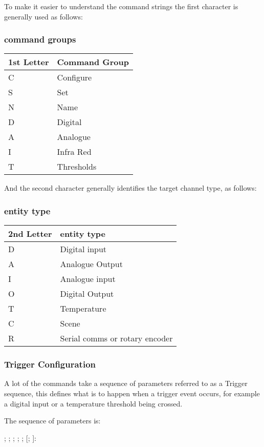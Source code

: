 To make it easier to understand the command strings the first character is generally used as follows:

\subsubsection{command groups}
\begin{tabular}{l|p{12cm}}
1st Letter&Command Group\\
\hline
C&Configure\\
S&Set\\
N&Name\\
D&Digital\\
A&Analogue\\
I&Infra Red\\
T&Thresholds\\
\end{tabular}

And the second character generally identifies the target channel type, as follows:
\subsubsection{entity type}
\begin{tabular}{l|p{12cm}}
2nd Letter&entity type\\
\hline
D&Digital input\\
A&Analogue Output\\
I&Analogue input\\
O&Digital Output\\
T&Temperature\\
C&Scene\\
R&Serial comms or rotary encoder\\
\end{tabular}

\subsubsection{Trigger Configuration}
A lot of the commands take a sequence of parameters referred to as a Trigger sequence, this 
defines what is to happen when a trigger event occurs, for example a digital input or 
a temperature threshold being crossed. 

The sequence of parameters is:

; ; ; ; ;  [; ]:

